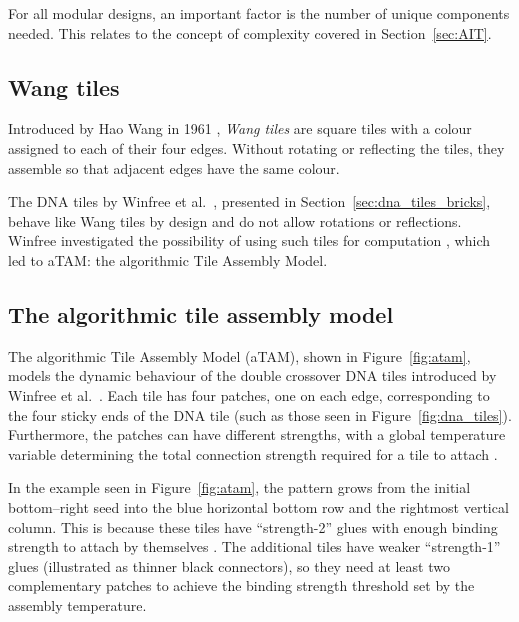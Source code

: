 For all modular designs, an important factor is the number of unique components needed. This relates to the concept of complexity covered in Section~\ref{sec:AIT}.

\subsection{Wang tiles}
Introduced by Hao Wang in 1961 \cite{wang1961proving}, \emph{Wang tiles} are square tiles with a colour assigned to each of their four edges. Without rotating or reflecting the tiles, they assemble so that adjacent edges have the same colour.


The DNA tiles by Winfree et al.\ \cite{winfree1998design}, presented in Section~\ref{sec:dna_tiles_bricks}, behave like Wang tiles by design and do not allow rotations or reflections. Winfree investigated the possibility of using such tiles for computation \cite{winfree1998algorithmic}, which led to aTAM: the algorithmic Tile Assembly Model.

\subsection{The algorithmic tile assembly model}
\label{sec:atam}


The algorithmic Tile Assembly Model (aTAM), shown in Figure~\ref{fig:atam}, models the dynamic behaviour of the double crossover DNA tiles introduced by Winfree et al.\ \cite{winfree1998design}. Each tile has four patches, one on each edge, corresponding to the four sticky ends of the DNA tile (such as those seen in Figure~\ref{fig:dna_tiles}). Furthermore, the patches can have different strengths, with a global temperature variable determining the total connection strength required for a tile to attach \cite{doty2012theory}.

In the example seen in Figure~\ref{fig:atam}, the pattern grows from the initial bottom--right seed into the blue horizontal bottom row and the rightmost vertical column. This is because these tiles have ``strength-2'' glues with enough binding strength to attach by themselves \cite{doty2012theory}. The additional tiles have weaker ``strength-1'' glues (illustrated as thinner black connectors), so they need at least two complementary patches to achieve the binding strength threshold set by the assembly temperature.

